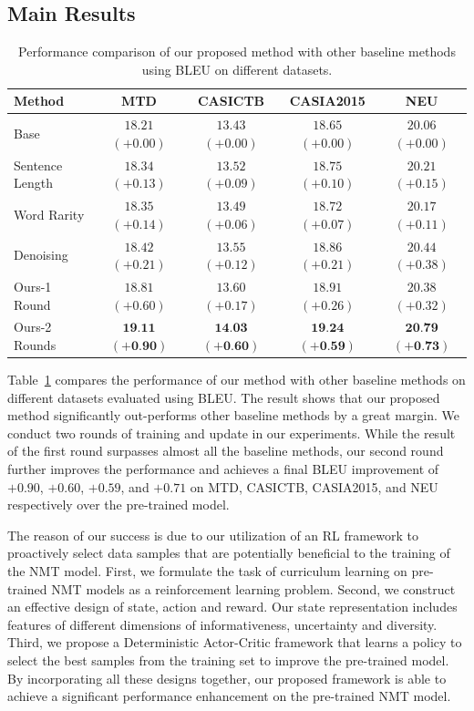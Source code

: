 \documentclass[letterpaper]{article}
\begin{document}
\subsection{Main Results}

\begin{table}[tb]
	\centering
    \begin{threeparttable}
      \caption{Performance comparison of our proposed method with other baseline methods using BLEU on different datasets.}
      \label{tab:results}
      \begin{tabular}{l|cccc}
        \toprule
        Method & MTD & CASICTB & CASIA2015 & NEU\\
        \midrule
        Base &  $18.21$ $(+0.00)$ & $13.43$ $(+0.00)$ & $18.65$ $(+0.00)$ & $20.06$ $(+0.00)$\\
        Sentence Length &  $18.34$ $(+0.13)$ & $13.52$ $(+0.09)$ & $18.75$ $(+0.10)$ & $20.21$ $(+0.15)$\\
        Word Rarity &  $18.35$ $(+0.14)$ & $13.49$ $(+0.06)$ & $18.72$ $(+0.07)$ & $20.17$ $(+0.11)$\\
        Denoising &  $18.42$ $(+0.21)$ & $13.55$ $(+0.12)$ & $18.86$ $(+0.21)$ & $20.44$ $(+0.38)$\\
        Ours-1 Round &  $18.81$ $(+0.60)$ & $13.60$ $(+0.17)$ & $18.91$ $(+0.26)$ & $20.38$ $(+0.32)$\\
        \midrule
        Ours-2 Rounds &  $\textbf{19.11}$ $(+\textbf{0.90})$ & $\textbf{14.03}$ $(+\textbf{0.60})$ & $\textbf{19.24}$ $(+\textbf{0.59})$ & $\textbf{20.79}$ $(+\textbf{0.73})$\\
        \bottomrule
      \end{tabular}
    \end{threeparttable}
\end{table}

Table~\ref{tab:results} compares the performance of our method with other baseline methods on different datasets evaluated using BLEU. The result shows that our proposed method significantly out-performs other baseline methods by a great margin. We conduct two rounds of training and update in our experiments. While the result of the first round surpasses almost all the baseline methods, our second round further improves the performance and achieves a final BLEU improvement of $+0.90$, $+0.60$, $+0.59$, and $+0.71$ on MTD, CASICTB, CASIA2015, and NEU respectively over the pre-trained model.

The reason of our success is due to our utilization of an RL framework to proactively select data samples that are potentially beneficial to the training of the NMT model. First, we formulate the task of curriculum learning on pre-trained NMT models as a reinforcement learning problem. Second, we construct an effective design of state, action and reward. Our state representation includes features of different dimensions of informativeness, uncertainty and diversity. Third, we propose a Deterministic Actor-Critic framework that learns a policy to select the best samples from the training set to improve the pre-trained model. By incorporating all these designs together, our proposed framework is able to achieve a significant performance enhancement on the pre-trained NMT model.
\end{document}
